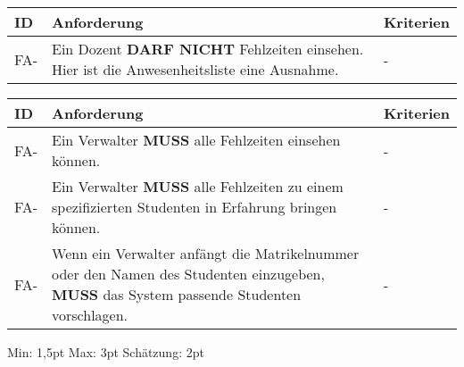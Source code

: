 \begin{tabular} {|p{}|p{11cm}|p{}|}
	\hline
	ID & Anforderung & Kriterien \\
	\hline
	FA-
	& Ein Dozent \textbf{DARF NICHT} Fehlzeiten einsehen. Hier ist die Anwesenheitsliste eine Ausnahme. 
	& - \\
	\hline
\end{tabular}

\begin{tabular} {|p{}|p{11cm}|p{}|}
	\hline
	ID & Anforderung & Kriterien \\
	\hline
	FA-
	& Ein Verwalter \textbf{MUSS} alle Fehlzeiten einsehen können. 
	& - \\
	\hline
	FA-
	& Ein Verwalter \textbf{MUSS} alle Fehlzeiten zu einem spezifizierten Studenten in Erfahrung bringen können.
	& - \\ 
	\hline
	FA-
	& Wenn ein Verwalter anfängt die Matrikelnummer oder den Namen des Studenten einzugeben, \textbf{MUSS} das System passende Studenten vorschlagen.
	& - \\ 
	\hline
\end{tabular}
Min: 1,5pt
Max: 3pt
Schätzung: 2pt

